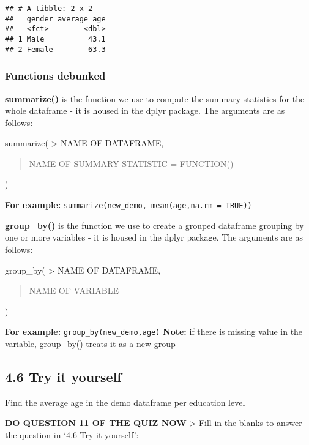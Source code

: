 \documentclass[
]{book}
\begin{document}
\begin{verbatim}
## # A tibble: 2 x 2
##   gender average_age
##   <fct>        <dbl>
## 1 Male          43.1
## 2 Female        63.3
\end{verbatim}

\hypertarget{functions-debunked-15}{%
\subsubsection{Functions debunked}\label{functions-debunked-15}}

\href{https://www.rdocumentation.org/packages/dplyr/versions/0.7.8/topics/summarise}{\textbf{summarize()}} is the function we use to compute the summary statistics for the whole dataframe - it is housed in the dplyr package. The arguments are as follows:

summarize(
\textgreater{} NAME OF DATAFRAME,

\begin{quote}
NAME OF SUMMARY STATISTIC = FUNCTION()
\end{quote}

)

\textbf{For example:} \texttt{summarize(new\_demo,\ mean(age,na.rm\ =\ TRUE))}

\href{https://www.rdocumentation.org/packages/dplyr/versions/0.7.8/topics/group_by}{\textbf{group\_by()}} is the function we use to create a grouped dataframe grouping by one or more variables - it is housed in the dplyr package. The arguments are as follows:

group\_by(
\textgreater{} NAME OF DATAFRAME,

\begin{quote}
NAME OF VARIABLE
\end{quote}

)

\textbf{For example:} \texttt{group\_by(new\_demo,age)}
\textbf{Note:} if there is missing value in the variable, group\_by() treats it as a new group

\hypertarget{try-it-yourself-19}{%
\subsection{4.6 Try it yourself}\label{try-it-yourself-19}}

Find the average age in the demo dataframe per education level

\textbf{DO QUESTION 11 OF THE QUIZ NOW}
\textgreater{} Fill in the blanks to answer the question in `4.6 Try it yourself':
\end{document}
